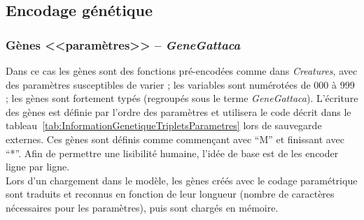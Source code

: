 \documentclass[11pt,twoside,a4paper]{article}
\begin{document}

\clearpage

\subsection{Encodage g{\'e}n{\'e}tique}

\subsubsection{G{\`e}nes <<param{\`e}tres>> -- \emph{GeneGattaca}}

Dans ce cas les g{\`e}nes sont des fonctions pr{\'e}-encod{\'e}es comme dans \textit{Creatures}, avec des param{\`e}tres susceptibles de varier ; les variables sont num{\'e}rot{\'e}es de 000 {\`a} 999 ; les g{\`e}nes sont fortement typ{\'e}s (regroup{\'e}s sous le terme \emph{GeneGattaca}). L'{\'e}criture des g{\`e}nes est d{\'e}finie par l'ordre des param{\`e}tres et utilisera le code d{\'e}crit dans le tableau~\ref{tab:InformationGenetiqueTripletsParametres} lors de sauvegarde externes. Ces g{\`e}nes sont d{\'e}finis comme commen\c{c}ant avec ``M'' et finissant avec ``*''. Afin de permettre une lisibilit{\'e} humaine, l'id{\'e}e de base est de les encoder ligne par ligne.~\\

Lors d'un chargement dans le mod{\`e}le, les g{\`e}nes cr{\'e}{\'e}s avec le codage param{\'e}trique sont traduits et reconnus en fonction de leur longueur (nombre de caract{\`e}res n{\'e}cessaires pour les param{\`e}tres), puis sont charg{\'e}s en m{\'e}moire. 
\end{document}
